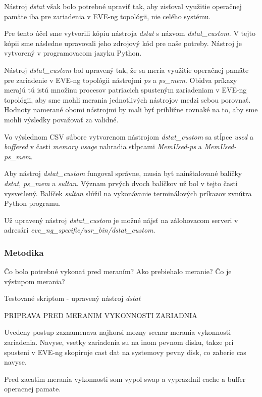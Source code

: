Nástroj \emph{dstat} však bolo potrebné upraviť tak, aby zisťoval využitie operačnej pamäte iba pre zariadenia v EVE-ng topológii, nie celého systému.

Pre tento účel sme vytvorili kópiu nástroja \emph{dstat} s názvom \emph{dstat\_custom}. V tejto kópii sme následne upravovali jeho zdrojový kód pre naše potreby. Nástroj je vytvorený v programovacom jazyku Python.

Nástroj \emph{dstat\_custom} bol upravený tak, že sa meria využitie operačnej pamäte pre zariadenie v EVE-ng topológii nástrojmi \emph{ps} a \emph{ps\_mem}. Obidva príkazy merajú tú istú množinu procesov patriacich spusteným zariadeniam v EVE-ng topológii, aby sme mohli merania jednotlivých nástrojov medzi sebou porovnať. Hodnoty namerané obomi nástrojmi by mali byť približne rovnaké na to, aby sme mohli výsledky považovať za validné.

Vo výslednom CSV súbore vytvorenom nástrojom \emph{dstat\_custom} sa stĺpce \emph{used} a \emph{buffered} v časti \emph{memory usage} nahradia stĺpcami \emph{MemUsed-ps} a \emph{MemUsed-ps\_mem}.

Aby nástroj \emph{dstat\_custom} fungoval správne, musia byť nainštalované balíčky \emph{dstat}, \emph{ps\_mem} a \emph{sultan}. Význam prvých dvoch balíčkov už bol v tejto časti vysvetlený. Balíček \emph{sultan} slúžil na vykonávanie terminálových príkazov zvnútra Python programu.

Už upravený nástroj \emph{dstat\_custom} je možné nájsť na zálohovacom serveri v adresári \emph{eve\_ng\_specific/usr\_bin/dstat\_custom}.





\subsubsection{Metodika}

Čo bolo potrebné vykonať pred meraním?
Ako prebiehalo meranie?
Čo je výstupom merania?


Testované skriptom - upravený nástroj \emph{dstat}

PRIPRAVA PRED MERANIM VYKONNOSTI ZARIADNIA

Uvedeny postup zaznamenava najhorsi mozny scenar merania vykonnosti
zariadenia. Navyse, vsetky zariadenia su na inom pevnom disku, takze pri
spusteni v EVE-ng skopiruje cast dat na systemovy pevny disk, co zaberie
cas navyse.

Pred zacatim merania vykonnosti som vypol swap a vyprazdnil cache a buffer
operacnej pamate.

